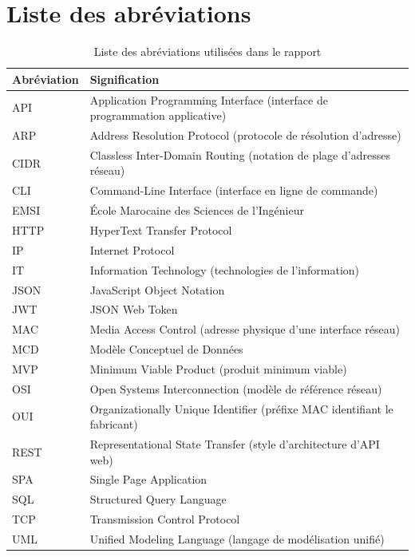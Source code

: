 \chapter*{Liste des abréviations}

\begin{table}[H]
    \centering
    \small
    \renewcommand{\arraystretch}{0.92}
    \caption{Liste des abréviations utilisées dans le rapport}
    \label{tab:abreviations}
    \begin{tabular}{@{}>{\raggedright\arraybackslash}p{3cm} >{\raggedright\arraybackslash}p{11cm}@{}}
        \toprule
        \textbf{Abréviation} & \textbf{Signification} \\
        \midrule
        API & Application Programming Interface (interface de programmation applicative) \\
        ARP & Address Resolution Protocol (protocole de résolution d'adresse) \\
        CIDR & Classless Inter-Domain Routing (notation de plage d'adresses réseau) \\
        CLI & Command-Line Interface (interface en ligne de commande) \\
        EMSI & École Marocaine des Sciences de l'Ingénieur \\
        HTTP & HyperText Transfer Protocol \\
        IP & Internet Protocol \\
        IT & Information Technology (technologies de l'information) \\
        JSON & JavaScript Object Notation \\
        JWT & JSON Web Token \\
        MAC & Media Access Control (adresse physique d'une interface réseau) \\
        MCD & Modèle Conceptuel de Données \\
        MVP & Minimum Viable Product (produit minimum viable) \\
        OSI & Open Systems Interconnection (modèle de référence réseau) \\
        OUI & Organizationally Unique Identifier (préfixe MAC identifiant le fabricant) \\
        REST & Representational State Transfer (style d'architecture d'API web) \\
        SPA & Single Page Application \\
        SQL & Structured Query Language \\
        TCP & Transmission Control Protocol \\
        UML & Unified Modeling Language (langage de modélisation unifié) \\
        \bottomrule
    \end{tabular}
\end{table}
